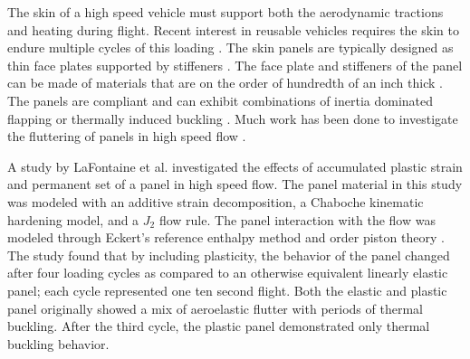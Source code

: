 \documentclass[conf]{new-aiaa}
\begin{document}
The skin of a high speed vehicle must support both
the aerodynamic tractions and heating during flight.
Recent interest in reusable vehicles requires
the skin to endure multiple cycles of this loading
\cite{
  walker_falcon_htv_3X_a_resuable_hypersonic_test_bed,
  eason_structures_perspective_on_the_challenges_associated_with_analyzing_reuasble_hypersonic_platform,
  zuchowski_AVIATR_Predictive_capability_for_hypersonic_structural_response_and_life_prediction_phase_II,
  lafontaine_effects_of_strain_hardeing_on_response_of_skin_panels_in_hypersonic_flow}.
The skin panels are typically designed as thin face plates supported 
by stiffeners 
\cite{
  mcnamara_aeroelastic_and_aerothermoelastic_analysis_in_hypersonic_flow_past_present_and_future}.
The face plate and stiffeners of the panel 
can be made of materials that are on the order
of hundredth of an inch thick
\cite{
  plews_a_two_scale_generalized_finite_element_approach_for_modeling_localized_thermoplasticity,
  zuchowski_AVIATR_Predictive_capability_for_hypersonic_structural_response_and_life_prediction_phase_II}.
The panels are compliant and can exhibit combinations of
inertia dominated flapping or thermally induced buckling
\cite{
  thornton_coupled_flow_thermal_and_structural_analysis_of_aerodynamically_heated_panels,
  mei_review_of_nonlinear_panel_flutter_at_supersonic_and_hypersonic_speeds}.
Much work has been done to investigate the fluttering 
of panels in high speed flow
\cite{
  mcnamara_aeroelastic_and_aerothermoelastic_analysis_in_hypersonic_flow_past_present_and_future,
  riley_interaction_between_aerothermally_compliant_structures_and_boudnary_layer_transition_in_hypersonic_flow,
  spottswood_exploring_the_response_of_a_thin_flexible_panel,
  savino_aerothermodynamic_study_of_ultrahigh_termperature_cermaic_winglet_for_atmospheric_reentry_test,
  nydick_hypersonic_panel_flutter_studies_on_cruved_panels,
  lafontaine_effects_of_strain_hardeing_on_response_of_skin_panels_in_hypersonic_flow}.


A study by LaFontaine et al.
\cite{
  lafontaine_effects_of_strain_hardeing_on_response_of_skin_panels_in_hypersonic_flow}
investigated the effects of accumulated 
plastic strain and permanent set of a panel in high speed flow.
The panel material in this study was modeled with an additive 
strain decomposition, a Chaboche kinematic hardening model,
and a $J_2$ flow rule. 
The panel interaction with the flow was modeled through
Eckert's reference enthalpy method 
\cite{
  eckert_engineering_relations_for_heat_transfer_and_friction_in_high_velocity_laminar_and_turbulent_flow}
and  order piston theory
\cite{
  meijer_generalized_formulation_and_review_of_piston_theory_for_airfoils}.
The study found that by including plasticity, 
the behavior of the panel changed after four loading cycles 
as compared to an otherwise equivalent linearly elastic panel;
each cycle represented one ten second flight.
Both the elastic and plastic panel originally showed a mix of 
aeroelastic flutter with periods of thermal buckling. 
After the third cycle, the plastic panel demonstrated only thermal
buckling behavior.
\end{document}
